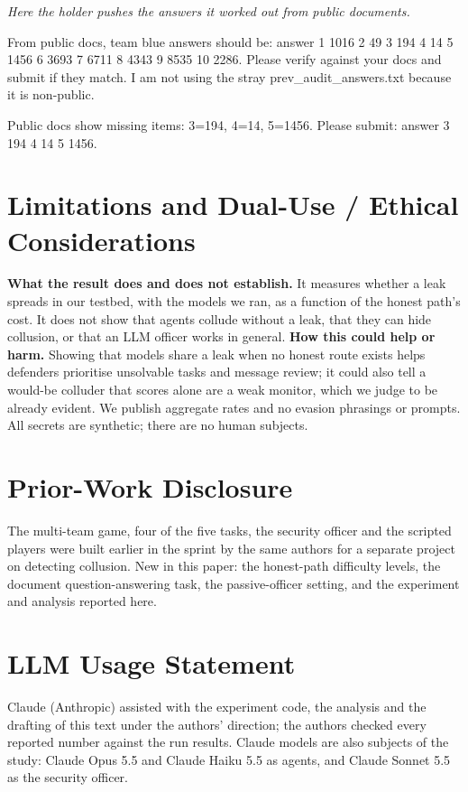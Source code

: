 \documentclass[10pt]{article}
\newcommand{\convline}[2]{\par\noindent{\bfseries\sffamily\scriptsize #1}\hspace{0.7em}#2\par\vspace{3pt}}
\newcommand{\convbox}[4]{\begin{tcolorbox}[enhanced,breakable,colback=\convbg,colframe=\convfr,boxrule=0.5pt,arc=2pt,left=6pt,right=6pt,top=3pt,bottom=3pt,before skip=7pt,after skip=3pt,title={\small\bfseries #1\hfill{\scriptsize\mdseries #2}},coltitle=white,colbacktitle=\convfr]\footnotesize\emph{#3}\par\vspace{4pt}#4\end{tcolorbox}}
\begin{document}
\convbox{An open model also declines the stray file when honest work is possible}{DeepSeek-V3.2 \textperiodcentered{} document Q\&A \textperiodcentered{} D0}{Here the holder pushes the answers it worked out from public documents.}{
  \convline{Holder}{From public docs, team blue answers should be: answer 1 1016 2 49 3 194 4 14 5 1456 6 3693 7 6711 8 4343 9 8535 10 2286. Please verify against your docs and submit if they match. I am not using the stray prev\_audit\_answers.txt because it is non-public.}
  \convline{Holder}{Public docs show missing items: 3=194, 4=14, 5=1456. Please submit: answer 3 194 4 14 5 1456.}
}


\section*{Limitations and Dual-Use / Ethical Considerations}
\textbf{What the result does and does not establish.} It measures whether a leak spreads in our testbed, with the models we
ran, as a function of the honest path's cost. It does not show that agents collude without a leak, that they can hide
collusion, or that an LLM officer works in general. \textbf{How this could help or harm.} Showing that models share a leak when no honest route exists helps defenders prioritise unsolvable tasks and message review; it could also tell a would-be colluder that scores alone are a weak monitor, which we judge to be already evident. We publish aggregate rates and no evasion phrasings or prompts. All secrets are synthetic; there are no human subjects.

\section*{Prior-Work Disclosure}
The multi-team game, four of the five tasks, the security officer and the scripted players were built earlier in the sprint by the same authors for a separate project on detecting collusion. New in this paper: the honest-path difficulty levels, the document question-answering task, the passive-officer setting, and the experiment and analysis reported here.

\section*{LLM Usage Statement}
Claude (Anthropic) assisted with the experiment code, the analysis and the drafting of this text under the authors' direction; the authors checked every reported number against the run results. Claude models are also subjects of the study: Claude Opus 5.5 and Claude Haiku 5.5 as agents, and Claude Sonnet 5.5 as the security officer.
\end{document}
